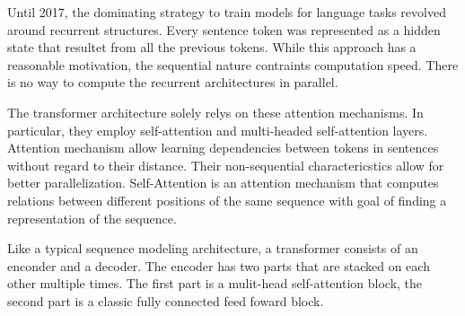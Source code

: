 \documentclass[../../main.tex]{subfiles}
\begin{document}
Until 2017, the dominating strategy to train models for language tasks revolved around recurrent structures.
Every sentence token was represented as a hidden state that resultet from all the previous tokens.
While this approach has a reasonable motivation, the sequential nature contraints computation speed.
There is no way to compute the recurrent architectures in parallel.

The transformer architecture \cite{Vaswani2017} solely relys on these attention mechanisms.
In particular, they employ self-attention and multi-headed self-attention layers.
Attention mechanism allow learning dependencies between tokens in sentences without regard to their distance.
Their non-sequential charactericstics allow for better parallelization.
Self-Attention is an attention mechanism that computes relations between different positions of the same sequence with goal of finding a representation of the sequence.

Like a typical sequence modeling architecture, a transformer consists of an enconder and a decoder. The encoder has two parts that are stacked on each other multiple times.
The first part is a mulit-head self-attention block, the second part is a classic fully connected feed foward block.
\end{document}
